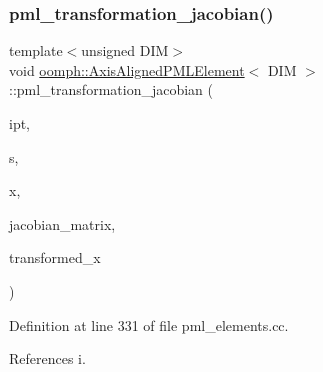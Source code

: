 \subsubsection{\texorpdfstring{pml\+\_\+transformation\+\_\+jacobian()}{pml\_transformation\_jacobian()}\hspace{0.1cm}{\footnotesize\ttfamily [3/4]}}
{\footnotesize\ttfamily template$<$unsigned D\+IM$>$ \\
void \hyperlink{classoomph_1_1AxisAlignedPMLElement}{oomph\+::\+Axis\+Aligned\+P\+M\+L\+Element}$<$ D\+IM $>$\+::pml\+\_\+transformation\+\_\+jacobian (\begin{DoxyParamCaption}\item[{const unsigned \&}]{ipt,  }\item[{const \hyperlink{classoomph_1_1Vector}{Vector}$<$ double $>$ \&}]{s,  }\item[{const \hyperlink{classoomph_1_1Vector}{Vector}$<$ double $>$ \&}]{x,  }\item[{\hyperlink{classoomph_1_1DiagonalComplexMatrix}{Diagonal\+Complex\+Matrix} \&}]{jacobian\+\_\+matrix,  }\item[{\hyperlink{classoomph_1_1Vector}{Vector}$<$ std\+::complex$<$ double $>$ $>$ \&}]{transformed\+\_\+x }\end{DoxyParamCaption})\hspace{0.3cm}{\ttfamily [virtual]}}



Definition at line 331 of file pml\+\_\+elements.\+cc.



References i.

\mbox{\label{classoomph_1_1AxisAlignedPMLElement_a808e638b642342a84da6749cdcdf78e4}} 
